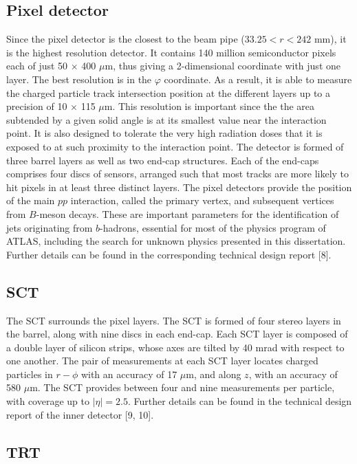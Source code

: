 \subsection*{Pixel detector}
Since the pixel detector is the closest to the beam pipe ($33.25 < r <242$ mm), it is
the highest resolution detector. It contains 140 million semiconductor pixels each of just
50 $\times$ 400 $\mu$m, 
thus giving a 2-dimensional coordinate with just one layer. The best resolution is in the $\varphi$ coordinate. 
As a result, it is able to measure the charged particle track intersection 
position at the different layers  up
to a precision of 10 $\times$ 115 $\mu$m.
This resolution is important since the 
the area subtended by a given solid angle is at its smallest value near the interaction point.
 It is also designed to tolerate the very high radiation
doses that it is exposed to at such proximity to the interaction point. The detector is
formed of three barrel layers as well as two end-cap structures. Each of the end-caps
comprises four discs of sensors, arranged such that most tracks are more likely to hit pixels in at
least three distinct layers.
The pixel detectors provide the position of the main $pp$
interaction, called the primary vertex, and subsequent vertices from 
$B$-meson decays. These are important parameters for the identification of jets originating from $b$-hadrons,
essential for most of the physics program of ATLAS, including the search for unknown physics presented in this dissertation. 
 Further details can be found in the corresponding technical design report [8].


\subsection*{SCT}

The SCT surrounds the pixel layers.
The SCT is formed of four stereo layers in the barrel,
along with nine discs in each end-cap. 
Each SCT layer is composed of a double layer of silicon
strips, whose axes are tilted by 40 mrad with respect to one another. The pair of measurements at
each SCT layer locates charged particles in $r - \phi$ with an accuracy of 17 $\mu$m, 
and along $z$, with an accuracy of 580 $\mu$m.
The SCT provides between four and nine measurements per particle, with
coverage up to $|\eta|=2.5$.
Further details can be found in the technical design report of the inner
detector [9, 10].

         
\subsection*{TRT}

